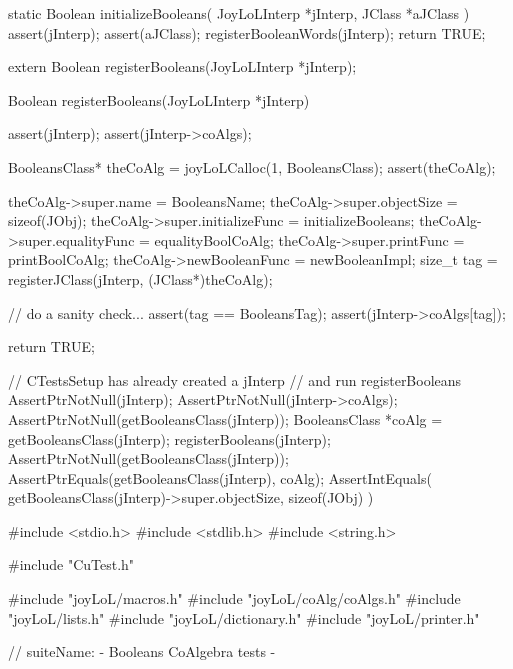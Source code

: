 \startCCode
static Boolean initializeBooleans(
  JoyLoLInterp *jInterp,
  JClass   *aJClass
) {
  assert(jInterp);
  assert(aJClass);
  registerBooleanWords(jInterp);
  return TRUE;
}
\stopCCode

\startCHeader
extern Boolean registerBooleans(JoyLoLInterp *jInterp);
\stopCHeader
{}

\startCCode
Boolean registerBooleans(JoyLoLInterp *jInterp) {
  assert(jInterp);
  assert(jInterp->coAlgs);
  
  BooleansClass* theCoAlg
    = joyLoLCalloc(1, BooleansClass);
  assert(theCoAlg);
  
  theCoAlg->super.name           = BooleansName;
  theCoAlg->super.objectSize     = sizeof(JObj);
  theCoAlg->super.initializeFunc = initializeBooleans;
  theCoAlg->super.equalityFunc   = equalityBoolCoAlg;
  theCoAlg->super.printFunc      = printBoolCoAlg;
  theCoAlg->newBooleanFunc       = newBooleanImpl;
  size_t tag =
    registerJClass(jInterp, (JClass*)theCoAlg);
  
  // do a sanity check...
  assert(tag == BooleansTag);
  assert(jInterp->coAlgs[tag]);
   
  return TRUE;
}
\stopCCode


\startCTest
  // CTestsSetup has already created a jInterp
  // and run registerBooleans
  AssertPtrNotNull(jInterp);
  AssertPtrNotNull(jInterp->coAlgs);
  AssertPtrNotNull(getBooleansClass(jInterp));
  BooleansClass *coAlg = getBooleansClass(jInterp);
  registerBooleans(jInterp);
  AssertPtrNotNull(getBooleansClass(jInterp));
  AssertPtrEquals(getBooleansClass(jInterp), coAlg);
  AssertIntEquals(
    getBooleansClass(jInterp)->super.objectSize,
    sizeof(JObj)
  )
\stopCTest
\stopTestCase
\stopTestSuite

\starttyping
#include <stdio.h>
#include <stdlib.h>
#include <string.h>

#include "CuTest.h"

#include "joyLoL/macros.h"
#include "joyLoL/coAlg/coAlgs.h"
#include "joyLoL/lists.h"
#include "joyLoL/dictionary.h"
#include "joyLoL/printer.h"

// suiteName: - Booleans CoAlgebra tests -

